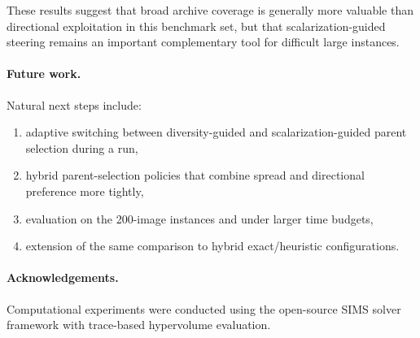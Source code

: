 \documentclass[11pt,a4paper]{article}
\begin{document}
These results suggest that broad archive coverage is generally more
valuable than directional exploitation in this benchmark set, but that
scalarization-guided steering remains an important complementary tool
for difficult large instances.

\paragraph{Future work.}
Natural next steps include:
\begin{enumerate}
  \item adaptive switching between diversity-guided and
    scalarization-guided parent selection during a run,
  \item hybrid parent-selection policies that combine spread and
    directional preference more tightly,
  \item evaluation on the 200-image instances and under larger time
    budgets,
  \item extension of the same comparison to hybrid exact/heuristic
    configurations.
\end{enumerate}

\paragraph{Acknowledgements.}
Computational experiments were conducted using the open-source SIMS
solver framework with trace-based hypervolume evaluation.
\end{document}
